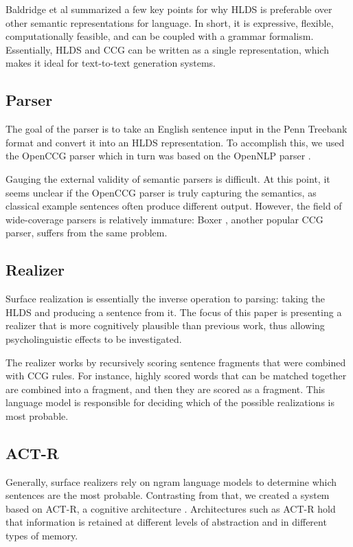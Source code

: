 \documentclass[11pt]{article}
\begin{document}
Baldridge et al summarized a few key points for why HLDS is preferable over other semantic representations for language. In short, it is expressive, flexible, computationally feasible, and can be coupled with a grammar formalism. Essentially, HLDS and CCG can be written as a single representation, which makes it ideal for text-to-text generation systems.

\subsection{Parser}
The goal of the parser is to take an English sentence input in the Penn Treebank format \citep{needed?} and convert it into an HLDS representation. To accomplish this, we used the OpenCCG parser \cite{not_sure_what} which in turn was based on the OpenNLP parser \cite{not_sure}. 

Gauging the external validity of semantic parsers is difficult. At this point, it seems unclear if the OpenCCG parser is truly capturing the semantics, as classical example sentences often produce different output. However, the field of wide-coverage parsers is relatively immature: Boxer \citep{boxer1} \citep{boxer2}, another popular CCG parser, suffers from the same problem. 

\subsection{Realizer}
Surface realization is essentially the inverse operation to parsing: taking the HLDS and producing a sentence from it. The focus of this paper is presenting a realizer that is more cognitively plausible than previous work, thus allowing psycholinguistic effects to be investigated. 

The realizer works by recursively scoring sentence fragments that were combined with CCG rules. For instance, highly scored words that can be matched together are combined into a fragment, and then they are scored as a fragment. This language model is responsible for deciding which of the possible realizations is most probable.

\subsection{ACT-R}
Generally, surface realizers rely on ngram language models to determine which sentences are the most probable. Contrasting from that, we created a system based on ACT-R, a cognitive architecture \citep{actr}. Architectures such as ACT-R hold that information is retained at different levels of abstraction and in different types of memory. 
\end{document}
